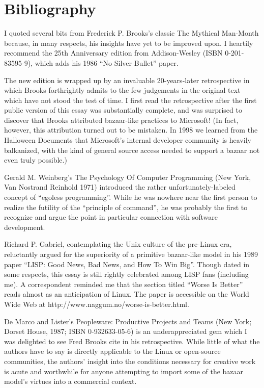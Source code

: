 \documentclass[a4paper,12pt,UTF8,twoside]{ctexbook}
\begin{document}
\chapter{Bibliography}

I quoted several bits from Frederick P. Brooks's classic The Mythical Man-Month because, in many respects, his insights have yet to be improved upon. I heartily recommend the 25th Anniversary edition from Addison-Wesley (ISBN 0-201-83595-9), which adds his 1986 ``No Silver Bullet'' paper.

The new edition is wrapped up by an invaluable 20-years-later retrospective in which Brooks forthrightly admits to the few judgements in the original text which have not stood the test of time. I first read the retrospective after the first public version of this essay was substantially complete, and was surprised to discover that Brooks attributed bazaar-like practices to Microsoft! (In fact, however, this attribution turned out to be mistaken. In 1998 we learned from the Halloween Documents that Microsoft's internal developer community is heavily balkanized, with the kind of general source access needed to support a bazaar not even truly possible.)

Gerald M. Weinberg's The Psychology Of Computer Programming (New York, Van Nostrand Reinhold 1971) introduced the rather unfortunately-labeled concept of ``egoless programming''. While he was nowhere near the first person to realize the futility of the ``principle of command'', he was probably the first to recognize and argue the point in particular connection with software development.

Richard P. Gabriel, contemplating the Unix culture of the pre-Linux era, reluctantly argued for the superiority of a primitive bazaar-like model in his 1989 paper ``LISP: Good News, Bad News, and How To Win Big''. Though dated in some respects, this essay is still rightly celebrated among LISP fans (including me). A correspondent reminded me that the section titled ``Worse Is Better'' reads almost as an anticipation of Linux. The paper is accessible on the World Wide Web at http://www.naggum.no/worse-is-better.html.

De Marco and Lister's Peopleware: Productive Projects and Teams (New York; Dorset House, 1987; ISBN 0-932633-05-6) is an underappreciated gem which I was delighted to see Fred Brooks cite in his retrospective. While little of what the authors have to say is directly applicable to the Linux or open-source communities, the authors' insight into the conditions necessary for creative work is acute and worthwhile for anyone attempting to import some of the bazaar model's virtues into a commercial context.
\end{document}
